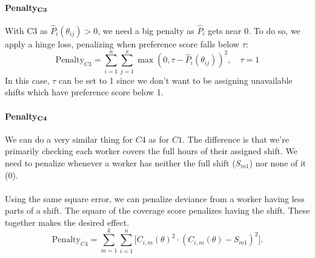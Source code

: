 \documentclass{article}
\begin{document}
\paragraph{Penalty$_{\mathbf{C3}}$}
With C3 as $\hat P_{i}(\theta_{ij})>0$, we need a big penalty as $\hat P_i$ gets near 0. To do so, we apply a hinge loss, penalizing when preference score falls below $\tau$:
    \[\text{Penalty}_{C3}=\sum_{i=1}^n\sum_{j=1}^x\max(0,\tau-\hat P_i(\theta_{ij}))^2,\quad\tau=1\]
In this case, $\tau$ can be set to 1 since we don't want to be assigning unavailable shifts which have preference score below 1.

\paragraph{Penalty$_{\mathbf{C4}}$}
We can do a very similar thing for $C4$ as for $C1$. The difference is that we're primarily checking each worker covers the full hours of their assigned shift. We need to penalize whenever a worker has neither the full shift ($S_{m1}$) nor none of it (0).\\\\
Using the same square error, we can penalize deviance from a worker having less parts of a shift. The square of the coverage score penalizes having the shift. These together makes the desired effect.
    \[\text{Penalty}_{C4}=\sum_{m=1}^k\sum_{i=1}^n\big[C_{i,m}(\theta)^2\cdot(C_{i,m}(\theta)-S_{m1})^2\big].\]
\end{document}
